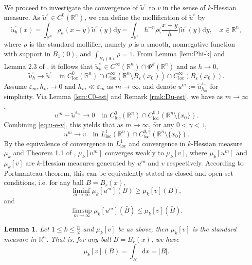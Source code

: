 \documentclass[reqno]{amsart}
\newtheorem{lemma}[theorem]{Lemma}
\theoremstyle{remark}
\theoremstyle{definition}
\numberwithin{equation}{section}
\begin{document}
We proceed to investigate the convergence of $\tilde{u}^{\varepsilon}$ to $v$ in the sense of $k$-Hessian measure. As $\tilde{u}^\varepsilon\in C^{0}(\mathbb{R}^n)$, we can define the mollification of $\tilde{u}^\varepsilon$ by
\[\tilde{u}^\varepsilon_h(x)=\int_{\mathbb{R}^n}\rho_{h}(x-y)\tilde{u}^\varepsilon(y)\mathrm{d}y=\int_{\mathbb{R}^n}h^{-n}\rho\bigg(\frac{x-y}{h}\bigg)\tilde{u}^\varepsilon(y)\mathrm{d}y,\quad x\in\mathbb{R}^n,\]
where $\rho$ is the standard mollifier, namely $\rho$ is a smooth, nonnegative function with support in $B_1(0)$, and 
$\int_{B_1(0)}\rho=1$. From Lemma \ref{lem:Phi-k} and Lemma 2.3 of \cite{Trudinger-Wang-II}, it follows that $\tilde{u}_h^\varepsilon\in C^\infty(\mathbb{R}^n)\cap\Phi^k(\mathbb{R}^n)$ and as $h\to0$,
\begin{equation}\label{eq:u-h-u}
	\tilde{u}_h^\varepsilon\to \tilde{u}^\varepsilon\quad\text{in }C^0_{\mathrm{loc}}(\mathbb{R}^n)\cap C^\infty_{\mathrm{loc}}(\mathbb{R}^n\setminus\bar{B}_\varepsilon(x_0))\cap C^\infty_{\mathrm{loc}}(B_\varepsilon(x_0)).
\end{equation}
Assume $\varepsilon_m, h_m \to 0$ and  $h_m \ll \varepsilon_m$ as $m \to \infty$, and denote  
$u^m := \tilde{u}_{h_m}^{\varepsilon_m}$ for simplicity. Via Lemma \ref{lem:C0-est} and Remark \ref{rmk:Du-est}, we have as $m\to\infty$, 
$$u^m-\tilde{u}^{\varepsilon_m}\to 0\quad\text{in }C_{\text{loc}}^0(\mathbb{R}^n) \cap C_{\text{loc}}^{0,1}(\mathbb{R}^n\setminus \{x_0\}).$$
Combining \eqref{eq:u-e-v}, this yields that as $m\to\infty$, for any $0<\gamma<1$,
$$u^m\to v \quad\text{in }L_{\text{loc}}^1(\mathbb{R}^n) \cap C_{\text{loc}}^{0,\gamma}(\mathbb{R}^n\setminus \{x_0\}).$$ 
By the equivalence of convergence in $L^1_{\mathrm{loc}}$ and convergence in $k$-Hessian measure $\mu_k$ and Theorem 1.1 of \cite{Trudinger-Wang-II}, $\mu_k[u^m]$ converges weakly to $\mu_k[v]$, where $\mu_k[u^m]$ and $\mu_k[v]$ are $k$-Hessian measures generated by $u^m$ and $v$ respectively. According to Portmanteau
theorem, this can be equivalently stated as closed and open set conditions, i.e. for any ball $B = B_r(x)$,    
\begin{equation}\label{eq:oc}
\liminf_{m \to \infty} \mu_k[u^m](B) \geq \mu_k[v](B),
\end{equation}
and  
\begin{equation}\label{eq:cc}
\limsup_{m \to \infty} \mu_k[u^m](\bar{B}) \leq \mu_k[v](\bar{B}).
\end{equation}
\begin{lemma}\label{lem:mu-k}
	Let $1\leq k\leq \frac{n}{2}$ and $\mu_k[v]$ be as above, then $\mu_k[v]$ is the standard measure in $\mathbb{R}^n$. That is, for any ball $B=B_r(x)$, we have 
$$\mu_k[v](B)=\int_B\mathrm{d}x=|B|.$$ 
\end{lemma}  
\end{document}
